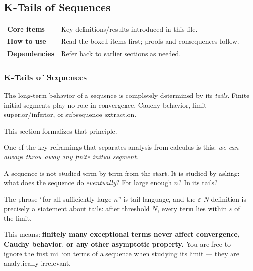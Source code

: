 
\subsection{K-Tails of Sequences}

\begin{tcolorbox}[colback=gray!6, colframe=gray!40, arc=2pt,
  left=6pt, right=6pt, top=4pt, bottom=4pt,
  title={\small\textbf{K Tails — Quick Reference}},
  fonttitle=\small\bfseries]
\begin{tabular}{@{}p{}p{}@{}}
\textbf{Core items} & Key definitions/results introduced in this file.\\
\textbf{How to use} & Read the boxed items first; proofs and consequences follow.\\
\textbf{Dependencies} & Refer back to earlier sections as needed.\\
\end{tabular}
\end{tcolorbox}


\subsubsection{K-Tails of Sequences}

The long-term behavior of a sequence is completely determined by its
\emph{tails}.  Finite initial segments play no role in convergence,
Cauchy behavior, limit superior/inferior, or subsequence extraction.

This section formalizes that principle.

\begin{remark*}
One of the key reframings that separates analysis from calculus is this:
\emph{we can always throw away any finite initial segment}.

A sequence is not studied term by term from the start.
It is studied by asking: what does the sequence do \emph{eventually}?
For large enough $n$?
In its tails?

The phrase ``for all sufficiently large $n$'' is tail language,
and the $\varepsilon$-$N$ definition is precisely a statement about tails:
after threshold $N$, every term lies within $\varepsilon$ of the limit.

This means: \textbf{finitely many exceptional terms never affect
convergence, Cauchy behavior, or any other asymptotic property.}
You are free to ignore the first million terms of a sequence when
studying its limit --- they are analytically irrelevant.
\end{remark*}


